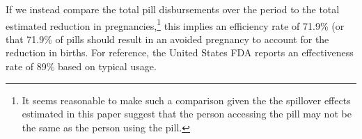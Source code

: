 \documentclass[11pt,subeqn]{article}
\begin{document}
\begin{spacing}{1.4}
If we instead compare the total pill disbursements over the period to the 
total estimated reduction in pregnancies,\footnote{It seems reasonable to make 
such a comparison given the the spillover effects estimated in this paper suggest 
that the person accessing the pill may not be the same as the person using the 
pill.}  this implies an efficiency rate of 71.9\% (or that 71.9\% of pills should 
result in an avoided pregnancy to account for the reduction in births.  For 
reference, the United States FDA reports an effectiveness rate of 89\% based on
typical usage.





\newpage



\end{spacing}
\end{document}
